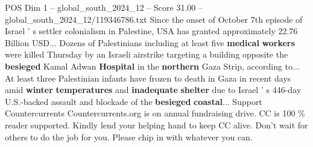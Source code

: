 \begin{textsample}{POS Dim 1 – global\_south\_2024\_12 – Score 31.00 – global\_south\_2024\_12/119346786.txt}
Since the onset of October 7th episode of Israel ' s settler colonialism in Palestine, USA has granted approximately 22.76 Billion USD...
Dozens of Palestinians including at least five \textbf{medical} \textbf{workers} were killed Thursday by an Israeli airstrike targeting a building opposite the \textbf{besieged} Kamal Adwan \textbf{Hospital} in the \textbf{northern} Gaza Strip, according to...
At least three Palestinian infants have frozen to death in Gaza in recent days amid \textbf{winter} \textbf{temperatures} and \textbf{inadequate} \textbf{shelter} due to Israel ' s 446-day U.S.-backed assault and blockade of the \textbf{besieged} \textbf{coastal}...
Support Countercurrents Countercurrents.org is on annual fundraising drive.
CC is 100 \% reader supported.
Kindly lend your helping hand to keep CC alive.
Don't wait for others to do the job for you.
Please chip in with whatever you can.

\end{textsample}
